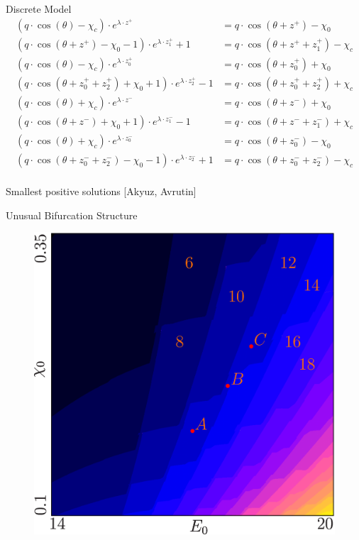 \begin{frame}{Discrete Model}
    \vspace{-3em}
    \begin{align*}
        (q \cdot \cos(\theta) - \chi_{c}) \cdot e^{\lambda \cdot z^{+}}
            & = q \cdot \cos(\theta + z^{+}) - \chi_{0}                  \\
        (q \cdot \cos(\theta + z^{+}) - \chi_{0} - 1) \cdot e^{\lambda \cdot z_{1}^{+}} + 1
            & = q \cdot  \cos(\theta + z^{+} + z_{1}^{+}) - \chi_{c}     \\
        (q \cdot \cos(\theta) - \chi_{c}) \cdot e^{\lambda \cdot z_{0}^{+}}
            & = q \cdot \cos(\theta + z_{0}^{+}) + \chi_{0}              \\
        (q \cdot \cos(\theta + z_{0}^{+} + z_{2}^{+}) + \chi_{0} + 1) \cdot e^{\lambda \cdot z_{2}^{+}} - 1
            & = q \cdot  \cos(\theta + z_{0}^{+} + z_{2}^{+}) + \chi_{c} \\[1em]
        (q \cdot \cos(\theta) + \chi_{c}) \cdot e^{\lambda \cdot z^{-}}
            & = q \cdot \cos(\theta + z^{-}) + \chi_{0}                  \\
        (q \cdot \cos(\theta + z^{-}) + \chi_{0} + 1) \cdot e^{\lambda \cdot z_{1}^{-}} - 1
            & = q \cdot  \cos(\theta + z^{-} + z_{1}^{-}) + \chi_{c}     \\
        (q \cdot \cos(\theta) + \chi_{c}) \cdot e^{\lambda \cdot z_{0}^{-}}
            & = q \cdot \cos(\theta + z_{0}^{-}) - \chi_{0}              \\
        (q \cdot \cos(\theta + z_{0}^{-} + z_{2}^{-}) - \chi_{0} - 1) \cdot e^{\lambda \cdot z_{2}^{-}} + 1
            & = q \cdot  \cos(\theta + z_{0}^{-} + z_{2}^{-}) - \chi_{c} \\
    \end{align*}
    \vspace{-3em}
    \begin{flushright}
        Smallest positive solutions
        \hfill
        [Akyuz, Avrutin]
    \end{flushright}
\end{frame}

\begin{frame}{Unusual Bifurcation Structure}
    \begin{figure}
        \includegraphics[width=0.45 \textwidth]{Figs/og_model_period.png}
    \end{figure}
\end{frame}

